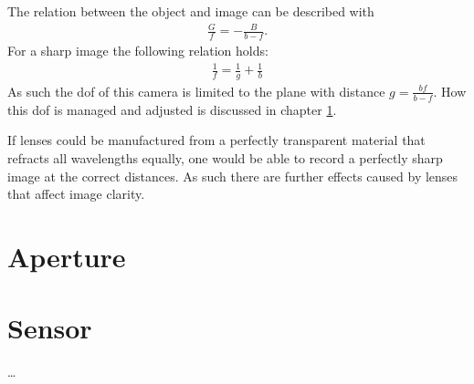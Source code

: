 The relation between the object and image can be described with
\begin{align}
    \frac{G}{f} = - \frac{B}{b-f}.
\end{align}
For a sharp image the following relation holds:
\begin{align}
    \frac{1}{f} = \frac{1}{g} + \frac{1}{b}
\end{align}
As such the \gls{dof} of this camera is limited to the plane with distance $g = \frac{bf}{b-f}$.
How this \gls{dof} is managed and adjusted is discussed in chapter \ref{ch:background-aperture}.

If lenses could be manufactured from a perfectly transparent material that refracts all wavelengths equally, one would be able to record a perfectly sharp image at the correct distances.
As such there are further effects caused by lenses that affect image clarity.



\section{Aperture}
\label{ch:background-aperture}



\section{Sensor}
\dots